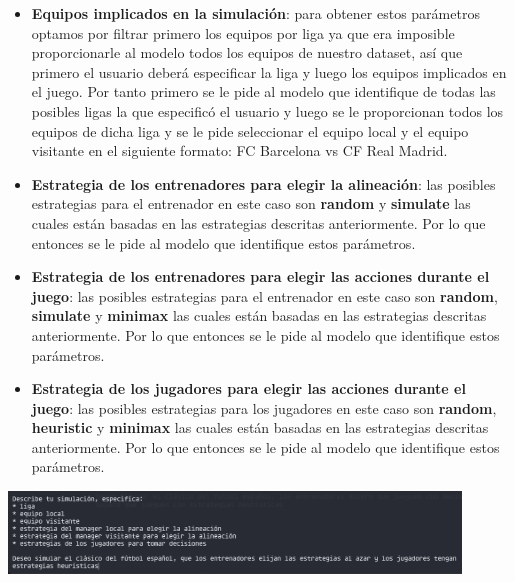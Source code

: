 \documentclass{article}
\begin{document}
\begin{itemize}
      \item \textbf{Equipos implicados en la simulación}: para obtener estos parámetros optamos por filtrar primero los
            equipos por liga ya que era imposible proporcionarle al modelo todos los equipos de nuestro dataset, así que primero
            el usuario deberá especificar la liga y luego los equipos implicados en el juego. Por tanto primero se le pide al
            modelo que identifique de todas las posibles ligas la que especificó el usuario y luego se le proporcionan todos
            los equipos de dicha liga y se le pide seleccionar el equipo local y el equipo visitante en el siguiente formato:
            FC Barcelona vs CF Real Madrid.
            
      \item \textbf{Estrategia de los entrenadores para elegir la alineación}: las posibles estrategias para el entrenador en este
            caso son \textbf{random} y \textbf{simulate} las cuales están basadas en las estrategias descritas anteriormente. Por lo
            que entonces se le pide al modelo que identifique estos parámetros.
            
      \item \textbf{Estrategia de los entrenadores para elegir las acciones durante el juego}: las posibles estrategias para el entrenador en este
            caso son \textbf{random}, \textbf{simulate} y \textbf{minimax} las cuales están basadas en las estrategias descritas anteriormente. Por lo
            que entonces se le pide al modelo que identifique estos parámetros.
            
      \item \textbf{Estrategia de los jugadores para elegir las acciones durante el juego}: las posibles estrategias para los jugadores en este
            caso son \textbf{random}, \textbf{heuristic} y \textbf{minimax} las cuales están basadas en las estrategias descritas anteriormente. Por lo
            que entonces se le pide al modelo que identifique estos parámetros.
            
            
\end{itemize}

\includegraphics*[width=0.9\textwidth]{llm.png}
\bigskip
\end{document}
